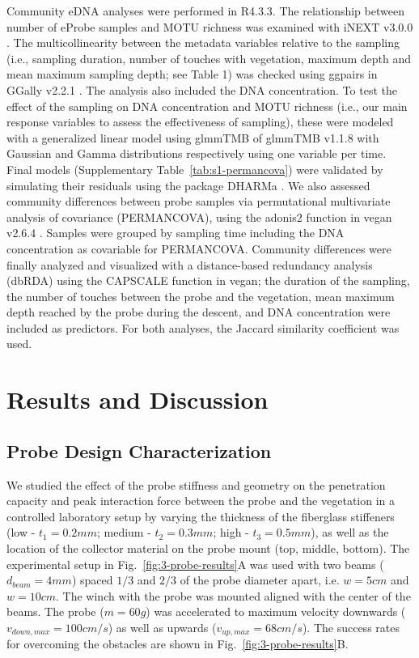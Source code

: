 Community \gls{eDNA} analyses were performed in R4.3.3. The relationship between number of eProbe samples and \gls{MOTU} richness was examined with iNEXT v3.0.0 \cite{hsieh-2016}. The multicollinearity between the metadata variables relative to the sampling (i.e., sampling duration, number of touches with vegetation, maximum depth and mean maximum sampling depth; see Table 1) was checked using ggpairs in GGally v2.2.1 \cite{ggally}. The analysis also included the DNA concentration. To test the effect of the sampling on DNA concentration and \gls{MOTU} richness (i.e., our main response variables to assess the effectiveness of sampling), these were modeled with a generalized linear model using glmmTMB of glmmTMB v1.1.8 \cite{brooks-2017} with Gaussian and Gamma distributions respectively using one variable per time. Final models (Supplementary Table~\ref{tab:s1-permancova}) were validated by simulating their residuals using the package DHARMa \cite{hartig-2022}. We also assessed community differences between probe samples via permutational multivariate analysis of covariance (PERMANCOVA), using the adonis2 function in vegan v2.6.4 \cite{oksanen-2022}. Samples were grouped by sampling time including the DNA concentration as covariable for PERMANCOVA. Community differences were finally analyzed and visualized with a distance-based redundancy analysis (dbRDA) using the CAPSCALE function in vegan; the duration of the sampling, the number of touches between the probe and the vegetation, mean maximum depth reached by the probe during the descent, and DNA concentration were included as predictors. For both analyses, the Jaccard similarity coefficient \cite{jaccard-1901} was used.


\section{Results and Discussion}
\label{sec:results}

\subsection{Probe Design Characterization}
\label{sec:results-probe}

We studied the effect of the probe stiffness and geometry on the penetration capacity and peak interaction force between the probe and the vegetation in a controlled laboratory setup by varying the thickness of the fiberglass stiffeners (low - $t_1 = 0.2mm$; medium - $t_2=0.3mm$; high - $t_3=0.5mm$), as well as the location of the collector material on the probe mount (top, middle, bottom). The experimental setup in Fig.~\ref{fig:3-probe-results}A was used with two beams ($d_{beam}=4mm$) spaced $1/3$ and $2/3$ of the probe diameter apart, i.e. $w=5cm$ and $w=10cm$. The winch with the probe was mounted aligned with the center of the beams. The probe ($m = 60g$) was accelerated to maximum velocity downwards ($v_{down,max} = 100 cm/s$) as well as upwards ($v_{up,max} = 68 cm/s$). The success rates for overcoming the obstacles are shown in Fig.~\ref{fig:3-probe-results}B.

